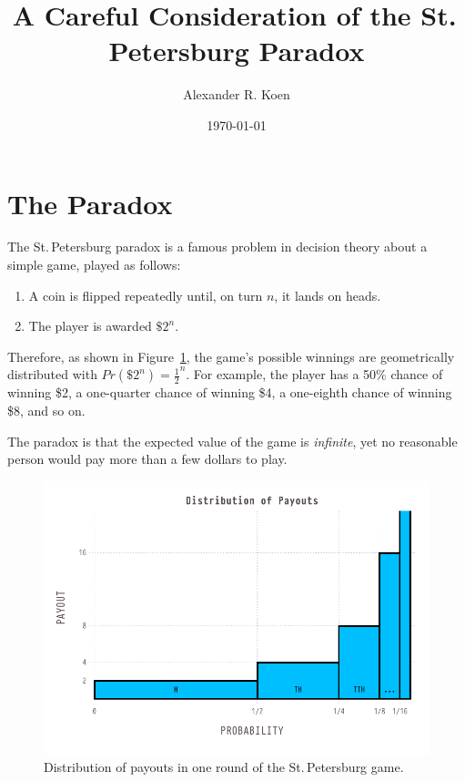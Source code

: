 \documentclass[11pt]{article}
\title{A Careful Consideration of the St.\,Petersburg Paradox}
\author{Alexander R. Koen}
\date{\today}
\begin{document}
\maketitle
\tableofcontents

\section{The Paradox}

The St.\,Petersburg paradox is a famous problem in decision theory about a simple game, played as follows:

\begin{enumerate}
\item A coin is flipped repeatedly until, on turn $n$, it lands on heads.
\item The player is awarded $\$2^n$.
\end{enumerate}


  Therefore, as shown in Figure~\ref{fig:distribution}, the game's possible winnings are geometrically distributed with $Pr(\$2^n)=\frac{1}{2}^{n}$. For example, the player has a 50\% chance of winning \$2, a one-quarter chance of winning \$4, a one-eighth chance of winning \$8, and so on.

The paradox is that the expected value of the game is \textit{infinite}, yet no reasonable person would pay more than a few dollars to play.

\begin{figure}
  \centering
  \includegraphics[width=\textwidth]{distribution}
  \caption{Distribution of payouts in one round of the St.\,Petersburg game.}
  \label{fig:distribution}
\end{figure}
\end{document}
